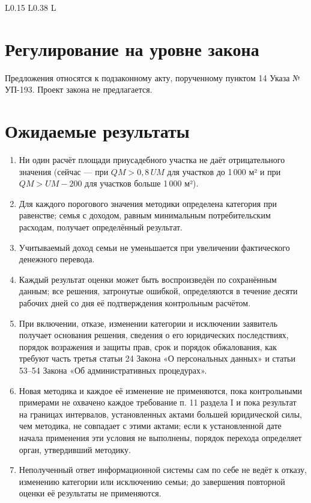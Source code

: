 \documentclass[14pt,a4paper]{extarticle}
\begin{document}
\begin{longtable}{L{0.15\linewidth} L{0.38\linewidth} L{\tabcolsep}}
\bottomrule
\end{longtable}\endgroup

\section{Регулирование на уровне закона}
Предложения относятся к подзаконному акту, порученному пунктом 14 Указа № УП-193. Проект закона не предлагается.

\section{Ожидаемые результаты}
\begin{enumerate}[leftmargin=1.27cm]
\item Ни один расчёт площади приусадебного участка не даёт отрицательного значения (сейчас — при $QM>0{,}8\,UM$ для участков до 1\,000 м² и при $QM>UM-200$ для участков больше 1\,000 м²).
\item Для каждого порогового значения методики определена категория при равенстве; семья с доходом, равным минимальным потребительским расходам, получает определённый результат.
\item Учитываемый доход семьи не уменьшается при увеличении фактического денежного перевода.
\item Каждый результат оценки может быть воспроизведён по сохранённым данным; все решения, затронутые ошибкой, определяются в течение десяти рабочих дней со дня её подтверждения контрольным расчётом.
\item При включении, отказе, изменении категории и исключении заявитель получает основания решения, сведения о его юридических последствиях, порядок возражения и защиты прав, срок и порядок обжалования, как требуют часть третья статьи 24 Закона «О персональных данных» и статьи 53–54 Закона «Об административных процедурах».
\item Новая методика и каждое её изменение не применяются, пока контрольными примерами не охвачено каждое требование п. 11 раздела I и пока результат на границах интервалов, установленных актами большей юридической силы, чем методика, не совпадает с этими актами; если к установленной дате начала применения эти условия не выполнены, порядок перехода определяет орган, утвердивший методику.
\item Неполученный ответ информационной системы сам по себе не ведёт к отказу, изменению категории или исключению семьи; до завершения повторной оценки её результаты не применяются.
\end{enumerate}
\end{document}

